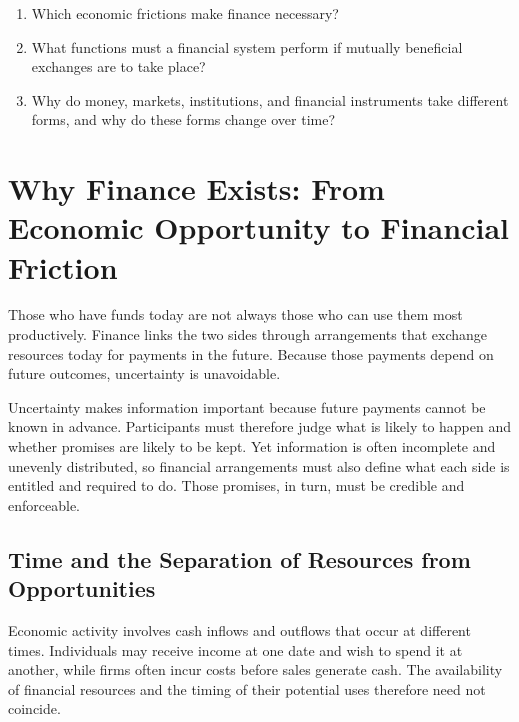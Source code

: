 \begin{tcolorbox}[
  enhanced,
  colback=FinanceBlue!6,
  colframe=FinanceBlue,
  boxrule=0.6pt,
  sharp corners,
  left=8pt,
  right=8pt,
  top=7pt,
  bottom=7pt,
  before skip=1em,
  after skip=1.6em,
  title=\textbf{Core Questions},
  coltitle=white,
  colbacktitle=FinanceBlue,
  fonttitle=\bfseries,
  attach boxed title to top left={xshift=6pt,yshift=-2mm},
  boxed title style={
    boxrule=0pt,
    sharp corners,
    left=5pt,
    right=5pt,
    top=2pt,
    bottom=2pt
  }
]
\begin{enumerate}[
  leftmargin=*,
  label=\textcolor{FinanceBlue}{\textbf{\arabic*.}},
  itemsep=0.55em,
  topsep=0.2em
]
\item Which economic frictions make finance necessary?
\item What functions must a financial system perform if mutually beneficial exchanges are to take place?
\item Why do money, markets, institutions, and financial instruments take different forms, and why do these forms change over time?
\end{enumerate}
\end{tcolorbox}

\section{Why Finance Exists: From Economic Opportunity to Financial Friction}

Those who have funds today are not always those who can use them most productively. Finance links the two sides through arrangements that exchange resources today for payments in the future. Because those payments depend on future outcomes, uncertainty is unavoidable.

Uncertainty makes information important because future payments cannot be known in advance. Participants must therefore judge what is likely to happen and whether promises are likely to be kept. Yet information is often incomplete and unevenly distributed, so financial arrangements must also define what each side is entitled and required to do. Those promises, in turn, must be credible and enforceable.

\subsection{Time and the Separation of Resources from Opportunities}

Economic activity involves cash inflows and outflows that occur at different times. Individuals may receive income at one date and wish to spend it at another, while firms often incur costs before sales generate cash. The availability of financial resources and the timing of their potential uses therefore need not coincide.

